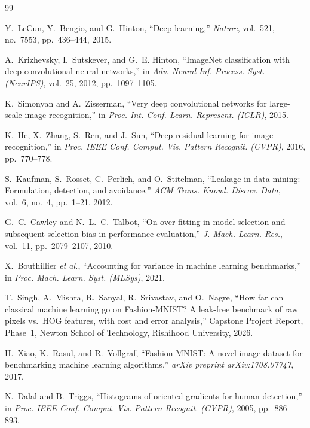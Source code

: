 \documentclass[conference]{IEEEtran}
\begin{document}
\begin{thebibliography}{99}

Y.~LeCun, Y.~Bengio, and G.~Hinton, ``Deep learning,'' \emph{Nature}, vol.~521, no.~7553, pp.~436--444, 2015.

A.~Krizhevsky, I.~Sutskever, and G.~E. Hinton, ``ImageNet classification with deep convolutional neural networks,'' in
\emph{Adv. Neural Inf. Process. Syst. (NeurIPS)}, vol.~25, 2012, pp.~1097--1105.

K.~Simonyan and A.~Zisserman, ``Very deep convolutional networks for large-scale image recognition,'' in \emph{Proc.
Int. Conf. Learn. Represent. (ICLR)}, 2015.

K.~He, X.~Zhang, S.~Ren, and J.~Sun, ``Deep residual learning for image recognition,'' in \emph{Proc. IEEE Conf.
Comput. Vis. Pattern Recognit. (CVPR)}, 2016, pp.~770--778.

S.~Kaufman, S.~Rosset, C.~Perlich, and O.~Stitelman, ``Leakage in data mining: Formulation, detection, and avoidance,''
\emph{ACM Trans. Knowl. Discov. Data}, vol.~6, no.~4, pp.~1--21, 2012.

G.~C.~Cawley and N.~L.~C.~Talbot, ``On over-fitting in model selection and subsequent selection bias in performance
evaluation,'' \emph{J. Mach. Learn. Res.}, vol.~11, pp.~2079--2107, 2010.

X.~Bouthillier \emph{et al.}, ``Accounting for variance in machine learning benchmarks,'' in \emph{Proc. Mach. Learn.
Syst. (MLSys)}, 2021.

T.~Singh, A.~Mishra, R.~Sanyal, R.~Srivastav, and O.~Nagre, ``How far can classical machine learning go on
Fashion-MNIST? A leak-free benchmark of raw pixels vs.\ HOG features, with cost and error analysis,'' Capstone Project
Report, Phase~1, Newton School of Technology, Rishihood University, 2026.

H.~Xiao, K.~Rasul, and R.~Vollgraf, ``Fashion-MNIST: A novel image dataset for benchmarking machine learning
algorithms,'' \emph{arXiv preprint arXiv:1708.07747}, 2017.

N.~Dalal and B.~Triggs, ``Histograms of oriented gradients for human detection,'' in \emph{Proc. IEEE Conf. Comput.
Vis. Pattern Recognit. (CVPR)}, 2005, pp.~886--893.


\end{thebibliography}
\end{document}
